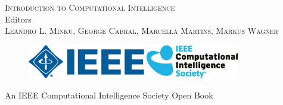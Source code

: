 

\thispagestyle{empty}
\providecommand\pdfbookmark[3][]{} \pdfbookmark[0]{Title Page}{bm:Title}
\vspace*{1cm}
\vfill
\begin{center}
\textsc{\huge{Introduction to Computational Intelligence}}\\
\vfill
Editors\\[\baselineskip]
\textsc{\Large{Leandro L. Minku, George Cabral, Marcella Martins, Markus Wagner}}
\vfill
\end{center}
\begin{figure}[ht!]
\centering
\includegraphics[height=1.5cm]{ieee-logo.png}
\hspace{0.5cm}
\includegraphics[height=1.5cm]{ieee-cis-logo.jpg}
\end{figure}
\begin{center}
An IEEE Computational Intelligence Society Open Book\\[-0.8em]
\end{center}
\clearpage

